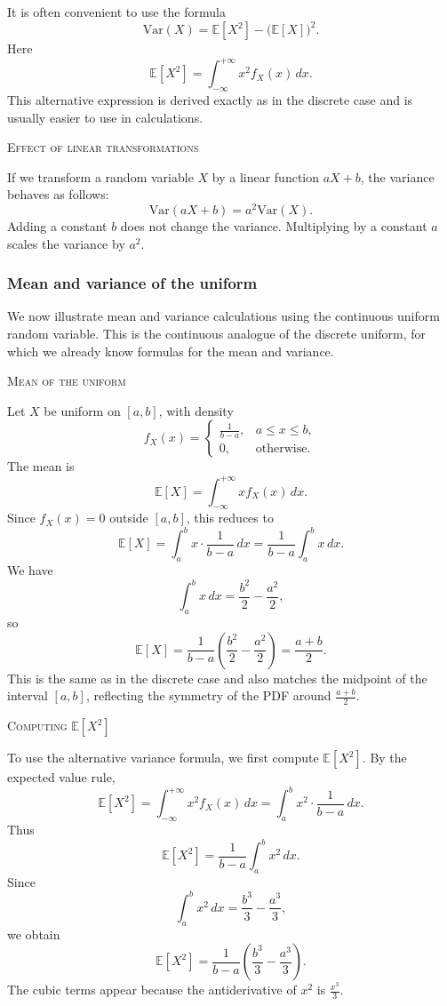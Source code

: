 It is often convenient to use the formula
\[
\mathrm{Var}(X) = \mathbb{E}[X^2] - \big(\mathbb{E}[X]\big)^2.
\]
Here
\[
\mathbb{E}[X^2] = \int_{-\infty}^{+\infty} x^2 f_X(x) \, dx.
\]
This alternative expression is derived exactly as in the discrete case and is usually easier to use in calculations.

\bigskip\textsc{Effect of linear transformations}

If we transform a random variable \(X\) by a linear function \(aX + b\), the variance behaves as follows:
\[
\mathrm{Var}(aX + b) = a^2 \mathrm{Var}(X).
\]
Adding a constant \(b\) does not change the variance.  
Multiplying by a constant \(a\) scales the variance by \(a^2\).


\subsubsection{Mean and variance of the uniform}

We now illustrate mean and variance calculations using the continuous uniform random variable.  
This is the continuous analogue of the discrete uniform, for which we already know formulas for the mean and variance.

\bigskip\textsc{Mean of the uniform}

Let \(X\) be uniform on \([a,b]\), with density
\[
f_X(x) =
\begin{cases}
\frac{1}{b-a}, & a \le x \le b, \\
0, & \text{otherwise}.
\end{cases}
\]
The mean is
\[
\mathbb{E}[X] = \int_{-\infty}^{+\infty} x f_X(x)\,dx.
\]
Since \(f_X(x)=0\) outside \([a,b]\), this reduces to
\[
\mathbb{E}[X] = \int_a^b x \cdot \frac{1}{b-a}\,dx = \frac{1}{b-a}\int_a^b x\,dx.
\]
We have
\[
\int_a^b x\,dx = \frac{b^2}{2} - \frac{a^2}{2},
\]
so
\[
\mathbb{E}[X] = \frac{1}{b-a}\left(\frac{b^2}{2} - \frac{a^2}{2}\right) = \frac{a+b}{2}.
\]
This is the same as in the discrete case and also matches the midpoint of the interval \([a,b]\), reflecting the symmetry of the PDF around \(\frac{a+b}{2}\).

\bigskip\textsc{Computing \(\mathbb{E}[X^2]\)}

To use the alternative variance formula, we first compute \(\mathbb{E}[X^2]\).  
By the expected value rule,
\[
\mathbb{E}[X^2] = \int_{-\infty}^{+\infty} x^2 f_X(x)\,dx = \int_a^b x^2 \cdot \frac{1}{b-a}\,dx.
\]
Thus
\[
\mathbb{E}[X^2] = \frac{1}{b-a}\int_a^b x^2\,dx.
\]
Since
\[
\int_a^b x^2\,dx = \frac{b^3}{3} - \frac{a^3}{3},
\]
we obtain
\[
\mathbb{E}[X^2] = \frac{1}{b-a}\left(\frac{b^3}{3} - \frac{a^3}{3}\right).
\]
The cubic terms appear because the antiderivative of \(x^2\) is \(\frac{x^3}{3}\).

